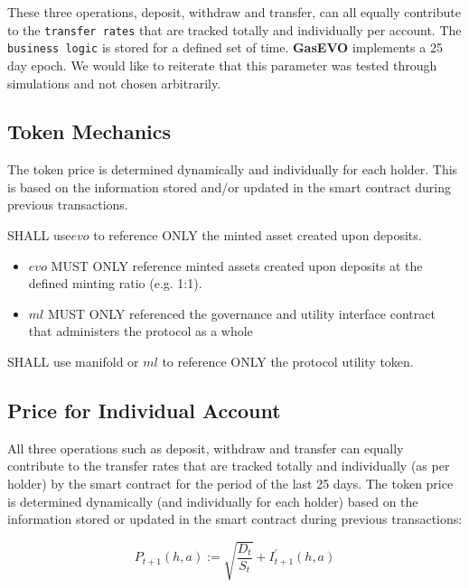 These three operations, deposit, withdraw and transfer,  can all equally contribute to
the \texttt{transfer rates} that are tracked totally and individually per account. The \texttt{business logic} is stored for a defined set of time. \textbf{GasEVO} implements a 25 day epoch. We would like to reiterate that this parameter was tested through simulations and not chosen arbitrarily. 

\subsection{Token Mechanics}
The token price is determined dynamically and individually for each holder. This is based on the
information stored and/or updated in the smart contract during previous transactions. 

SHALL use$ evo$ to reference ONLY the minted asset created upon deposits.
\linebreak

\begin{itemize}
    \item $evo$ MUST ONLY reference minted assets created upon deposits at the defined minting ratio (e.g. 1:1).
    \item $ml$ MUST ONLY referenced the governance and utility interface contract that administers the protocol as a whole
\end{itemize}

 SHALL use  manifold  or $ml$ to reference ONLY the protocol utility token.

\newpage
\subsection{Price for Individual Account} 
 All three operations such as deposit, withdraw and transfer can equally contribute to the transfer rates that are tracked totally and individually (as per holder)
by the smart contract for the period of the last 25 days. The token price is determined dynamically (and individually for each holder) based on the information stored or updated in the smart contract during previous transactions:

\begin{tcolorbox}
\label{eq:Base Primitive Equation}


\begin{equation}
P_{t+1}(h, a):=\sqrt{\frac{D_{t}}{S_{t}}}+I_{t+1}^{\prime}(h, a)
\end{equation}

\end{tcolorbox}

